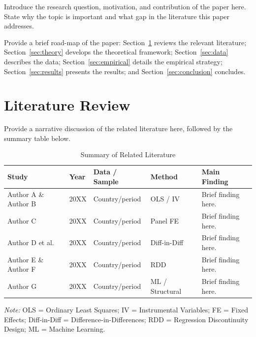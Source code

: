 \documentclass[12pt, a4paper]{article}
\theoremstyle{definition}
\theoremstyle{remark}
\begin{document}
Introduce the research question, motivation, and contribution of the paper here.
State why the topic is important and what gap in the literature this paper addresses.

Provide a brief road-map of the paper: Section~\ref{sec:literature} reviews the
relevant literature; Section~\ref{sec:theory} develops the theoretical framework;
Section~\ref{sec:data} describes the data; Section~\ref{sec:empirical} details the
empirical strategy; Section~\ref{sec:results} presents the results; and
Section~\ref{sec:conclusion} concludes.

\section{Literature Review}
\label{sec:literature}

Provide a narrative discussion of the related literature here, followed by the
summary table below.

\vspace{1em}

\begin{table}[H]
    \centering
    \caption{Summary of Related Literature}
    \label{tab:literature}
    \small
    \begin{tabularx}{\textwidth}{P{2.8cm} P{1.4cm} P{2.6cm} P{2.6cm} P{3.8cm}}
        \toprule
        \textbf{Study} & \textbf{Year} & \textbf{Data / Sample} & \textbf{Method} & \textbf{Main Finding} \\
        \midrule
        Author A \& Author B  & 20XX & Country/period & OLS / IV        & Brief finding here. \\[4pt]
        Author C              & 20XX & Country/period & Panel FE        & Brief finding here. \\[4pt]
        Author D et al.       & 20XX & Country/period & Diff-in-Diff    & Brief finding here. \\[4pt]
        Author E \& Author F  & 20XX & Country/period & RDD             & Brief finding here. \\[4pt]
        Author G              & 20XX & Country/period & ML / Structural & Brief finding here. \\
        \bottomrule
    \end{tabularx}
    \begin{minipage}{\textwidth}
        \vspace{3pt}
        \footnotesize\textit{Note:} OLS = Ordinary Least Squares; IV = Instrumental Variables;
        FE = Fixed Effects; Diff-in-Diff = Difference-in-Differences; RDD = Regression
        Discontinuity Design; ML = Machine Learning.
    \end{minipage}
\end{table}
\end{document}
